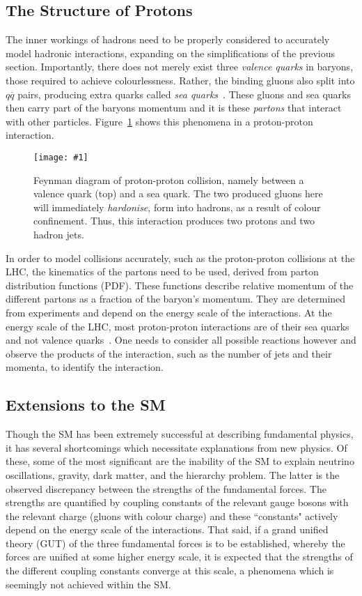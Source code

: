 \documentclass[twocolumn]{article}
\newcommand{\insertFigure}[1]{%
   \texttt{[image: \#1]}%
}
\begin{document}
\subsection{The Structure of Protons} 
The inner workings of hadrons need to be properly considered to accurately model hadronic interactions, expanding on the simplifications of the previous section. Importantly, there does not merely exist three \textsl{valence quarks} in baryons, those required to achieve colourlessness. Rather, the binding gluons also split into $q\overline{q}$ pairs, producing extra quarks called \textsl{sea quarks}~\cite{manual}. These gluons and sea quarks then carry part of the baryons momentum and it is these \textsl{partons} that interact with other particles. Figure~\ref{fig:parton} shows this phenomena in a proton-proton interaction.
\begin{figure}[!h]
	\centering
	\insertFigure{Images/parton.png}
	\caption{Feynman diagram of proton-proton collision, namely between a valence quark (top) and a sea quark. The two produced gluons here will immediately \textsl{hardonise}, form into hadrons, as a result of colour confinement. Thus, this interaction produces two protons and two hadron jets.~\cite{manual}}
	\label{fig:parton}
\end{figure}
In order to model collisions accurately, such as the proton-proton collisions at the LHC, the kinematics of the partons need to be used, derived from parton distribution functions (PDF). These functions describe relative momentum of the different partons as a fraction of the baryon's momentum. They are determined from experiments and depend on the energy scale of the interactions. At the energy scale of the LHC, most proton-proton interactions are of their sea quarks and not valence quarks~\cite{manual}. One needs to consider all possible reactions however and observe the products of the interaction, such as the number of jets and their momenta, to identify the interaction.


\subsection{Extensions to the SM}
Though the SM has been extremely successful at describing fundamental physics, it has several shortcomings which necessitate explanations from new physics. Of these, some of the most significant are the inability of the SM to explain neutrino oscillations, gravity, dark matter, and the hierarchy problem. The latter is the observed discrepancy between the strengths of the fundamental forces. The strengths are quantified by coupling constants of the relevant gauge bosons with the relevant charge (gluons with colour charge) and these ``constants" actively depend on the energy scale of the interactions. That said, if a grand unified theory (GUT) of the three fundamental forces is to be established, whereby the forces are unified at some higher energy scale, it is expected that the strengths of the different coupling constants converge at this scale, a phenomena which is seemingly not achieved within the SM. \\
\end{document}
